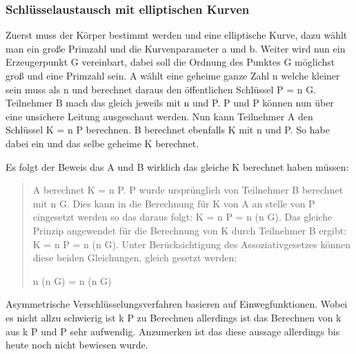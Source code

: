 		\subsubsection{Schlüsselaustausch mit elliptischen Kurven}
			Zuerst muss der Körper bestimmt werden und eine elliptische Kurve, dazu wählt man ein große Primzahl und die Kurvenparameter a und b. Weiter wird nun ein Erzeugerpunkt G vereinbart, dabei soll die Ordnung des Punktes G möglichst groß und eine Primzahl sein. A wählt eine geheime ganze Zahl n welche kleiner sein muss als n und berechnet daraus den öffentlichen Schlüssel P = n \mycdot G. Teilnehmer B mach das gleich jeweils mit n und P. P und P können nun über eine unsichere Leitung ausgeschaut werden. Nun kann Teilnehmer A den Schlüssel K = n \mycdot P berechnen. B berechnet ebenfalls K mit n und P. So habe dabei ein und das selbe geheime K berechnet.
			
			Es folgt der Beweis das A und B wirklich das gleiche K berechnet haben müssen:
			\begin{quote}
				\begin{beweis}
					A berechnet K = n \mycdot P\myTiefstellen{B}. P wurde ursprünglich von Teilnehmer B berechnet mit n \mycdot G. Dies kann in die Berechnung für K von A an stelle von P eingesetzt werden so das daraus folgt: K = n \mycdot P = n \mycdot (n \mycdot G). Das gleiche Prinzip angewendet für die Berechnung von K durch Teilnehmer B ergibt: K = n \mycdot P = n \mycdot (n \mycdot G). Unter Berücksichtigung des Assoziativgesetzes können diese beiden Gleichungen, gleich gesetzt werden:
					
					\centering n \mycdot (n \mycdot G) = n \mycdot (n\myTiefstellen{A} \mycdot G)
				\end{beweis}
			\end{quote}
			
			Asymmetrische Verschlüsselungsverfahren basieren auf Einwegfunktionen. Wobei es nicht allzu schwierig ist k \mycdot P zu Berechnen allerdings ist das Berechnen von k aus k \mycdot P und P sehr aufwendig. Anzumerken ist das diese aussage allerdings bis heute noch nicht bewiesen wurde.
			
